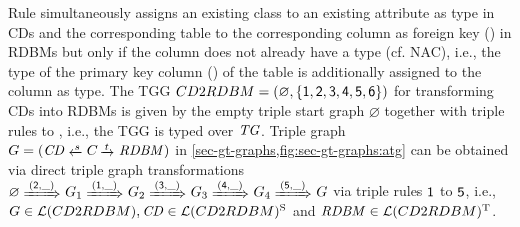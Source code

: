 \begin{example}
Rule  simultaneously assigns an existing class to an existing attribute as type in CDs and the corresponding table to the corresponding column as foreign key () in RDBMs but only if the column does not already have a type (cf. NAC), i.e., the type of the primary key column () of the table is additionally assigned to the column as type.
The TGG $CD2RDBM=(\varnothing,\{\mathsf{1},\mathsf{2},\mathsf{3},\mathsf{4},\mathsf{5},\mathsf{6}\})$ for transforming CDs into RDBMs is given by the empty triple start graph $\varnothing$ together with triple rules  to , i.e., the TGG is typed over $\mathit{TG}$.
Triple graph $G=(\CD \transB{s} C \trans{t} \RDBM)$ in \cref{sec-gt-graphs,fig:sec-gt-graphs:atg} can be obtained via direct triple graph transformations $\varnothing \Trans{(\code{2},\_)} G_1 \Trans{(\code{1},\_)} G_2 \Trans{(\code{3},\_)} G_3 \Trans{(\code{4},\_)} G_4 \Trans{(\code{5},\_)} G$ via triple rules $\mathsf{1}$ to $\mathsf{5}$, i.e., $G \in \mathcal{L}(CD2RDBM),\mathit{CD} \in \mathcal{L}(CD2RDBM)^\mathrm{S}$ and $\mathit{RDBM} \in \mathcal{L}(CD2RDBM)^\mathrm{T}$.
\envEndMarker
\end{example}

